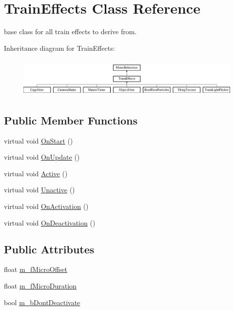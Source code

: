 \hypertarget{class_train_effects}{}\section{Train\+Effects Class Reference}
\label{class_train_effects}


base class for all train effects to derive from.  


Inheritance diagram for Train\+Effects\+:\begin{figure}[H]
\begin{center}
\leavevmode
\includegraphics[height=2.000000cm]{class_train_effects}
\end{center}
\end{figure}
\subsection*{Public Member Functions}
\begin{DoxyCompactItemize}
\item 
virtual void \mbox{\hyperlink{class_train_effects_acabdc668bc9a6cf6d8d9e06fa5ccb071}{On\+Start}} ()
\item 
virtual void \mbox{\hyperlink{class_train_effects_a245e2891464a93bda2d8f80c1fb53e2c}{On\+Update}} ()
\item 
virtual void \mbox{\hyperlink{class_train_effects_a444cb0c6444a8945f5e1a7f02dc83b99}{Active}} ()
\item 
virtual void \mbox{\hyperlink{class_train_effects_a126011673013f79d482f135be84afc96}{Unactive}} ()
\item 
virtual void \mbox{\hyperlink{class_train_effects_ad77aba799a5d19a141128639a4bebcad}{On\+Activation}} ()
\item 
virtual void \mbox{\hyperlink{class_train_effects_abc55d7e7440cb7a076c7342c3cf74165}{On\+Deactivation}} ()
\end{DoxyCompactItemize}
\subsection*{Public Attributes}
\begin{DoxyCompactItemize}
\item 
float \mbox{\hyperlink{class_train_effects_a56a29c87a665debd7ccb1da5557378a9}{m\+\_\+f\+Micro\+Offset}}
\item 
float \mbox{\hyperlink{class_train_effects_aba08005402c37f100884dc204e3e69ff}{m\+\_\+f\+Micro\+Duration}}
\item 
bool \mbox{\hyperlink{class_train_effects_a3ce7bfc16cf90cb9edfe9b585163d0cf}{m\+\_\+b\+Dont\+Deactivate}}
\end{DoxyCompactItemize}
